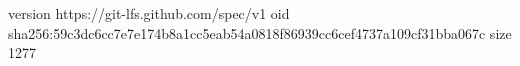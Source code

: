 version https://git-lfs.github.com/spec/v1
oid sha256:59c3dc6cc7e7e174b8a1cc5eab54a0818f86939cc6cef4737a109cf31bba067c
size 1277
